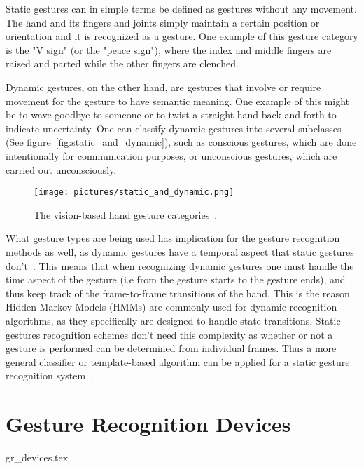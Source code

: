 Static gestures can in simple terms be defined as gestures
without any movement. The hand and its fingers and joints simply maintain a certain position or orientation and it is recognized as a gesture. One example 
of this gesture category is the "V sign" (or the "peace sign"), where the index and middle fingers are raised and parted while the other fingers are clenched.

Dynamic gestures, on the other hand, are gestures that involve or require movement for the gesture to have semantic meaning. One example of this
might be to wave goodbye to someone or to twist a straight hand back and forth to indicate uncertainty. One can classify dynamic gestures into several 
subclasses (See figure~\vref{fig:static_and_dynamic}), such as conscious gestures, which are done intentionally for communication purposes, 
or unconscious gestures, which are carried out unconsciously.

\begin{figure}%
	\texttt{[image: pictures/static\_and\_dynamic.png]}
	\caption[The vision-based hand gesture categories]{The vision-based hand gesture categories~\citep{Kanniche2009}.}
	\label{fig:static_and_dynamic}
\end{figure} 


What gesture types are being used has implication for the gesture recognition methods as well, as dynamic gestures have a temporal aspect that 
static gestures don't~\citep{Rautaray2015}. This means that when recognizing dynamic gestures one must handle the time aspect of the gesture (i.e from the gesture starts
to the gesture ends), and thus keep track of the frame-to-frame transitions of the hand. This is the reason Hidden Markov Models (HMMs) are commonly used for
dynamic recognition algorithms, as they specifically are designed to handle state transitions. Static gestures recognition schemes don't need this complexity as 
whether or not a gesture is performed can be determined from individual frames. Thus a more general classifier or template-based algorithm can be applied for a 
static gesture recognition system~\citep{Rautaray2015}.

\section{Gesture Recognition Devices}
\label{sec:gr_devices}
{gr_devices.tex}


